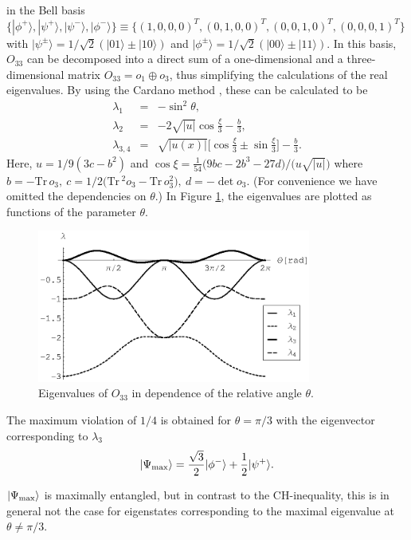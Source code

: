 \documentclass[pra,amsmath,amsfonts,showkeys,showpacs,preprint]{revtex4}
\begin{document}
in the Bell basis
$\{|\phi^+ \rangle,|\psi^+ \rangle,|\psi^- \rangle,|\phi^- \rangle\}
\equiv \{(1,0,0,0)^T,(0,1,0,0)^T,(0,0,1,0)^T,(0,0,0,1)^T\}$
with
$|\psi^\pm \rangle = 1/\sqrt{2}(|01 \rangle \pm |10 \rangle)$ and
$|\phi^\pm \rangle = 1/\sqrt{2}(|00 \rangle \pm |11 \rangle)$.
In this basis, $O_{33}$ can be decomposed into a direct sum of a
one-dimensional and a three-dimensional matrix $O_{33} = o_1 \oplus
o_3$, thus simplifying the calculations of the real eigenvalues.
By using the Cardano method \cite{cocolicchio00}, these can be calculated to be
\begin{eqnarray}
\lambda_1 &=& -\sin^2\theta,\nonumber\\
\lambda_2 &=& -2 \sqrt{|u|}\cos\frac{\xi}{3}-\frac{b}{3},\nonumber\\
\lambda_{3,4}& =& \sqrt{|u(x)|}\Big[\cos\frac{\xi}{3} \pm
\sin\frac{\xi}{3}\Big]-\frac{b}{3}.
\label{2004-qbounds-o33ev}
\end{eqnarray}
Here, $u=1/9(3 c-b^2)$ and $\cos\xi = \frac{1}{54}\big(9 b c -2 b^3 -
27 d\big)/\big(u\sqrt{|u|}\big)$ where
$b = -\mbox{Tr}\, o_3,\ c = 1/2\Big(\mbox{Tr}\,^2 o_3 -
\mbox{Tr}\, o_3^2 \Big),\ d = -\det o_3$.
(For convenience we have omitted the dependencies on $\theta$.)
In Figure \ref{fig:2004-qbounds-f1},
the eigenvalues are plotted  as functions of the parameter $\theta$.
\begin{figure}[htbp]
  \centering
  \includegraphics[width=90mm]{2005-filipp-svo-tracing-f1}
  \caption{Eigenvalues of $O_{33}$ in dependence of the relative angle $\theta$.}
  \label{fig:2004-qbounds-f1}
\end{figure}
The maximum violation of $1/4$ is obtained for $\theta=\pi/3$ with the
eigenvector corresponding to $\lambda_3$
\begin{equation}
  |\Psi_{\rm max } \rangle=\frac{\sqrt{3}}{2}|\phi^- \rangle+\frac{1}{2}|\psi^+ \rangle.
\label{2004-qbounds-pmax33}
\end{equation}

$|\Psi_{\rm max } \rangle$ is maximally entangled, but in contrast to
the CH-inequality, this is in general not the case for
eigenstates corresponding to the maximal eigenvalue at $\theta \neq
\pi/3$.
\end{document}
